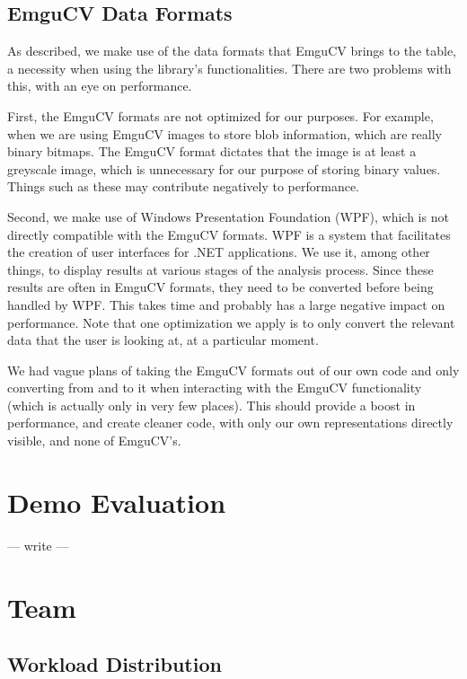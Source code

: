 \documentclass[10pt, abstracton, twocolumn]{scrartcl}
\begin{document}
\begin{appendices}
\subsection{EmguCV Data Formats}
\label{sec:emgucvFormats}
As described, we make use of the data formats that EmguCV brings to the table, a necessity when using the library's functionalities. There are two problems with this, with an eye on performance.

First, the EmguCV formats are not optimized for our purposes. For example, when we are using EmguCV images to store blob information, which are really binary bitmaps. The EmguCV format dictates that the image is at least a greyscale image, which is unnecessary for our purpose of storing binary values. Things such as these may contribute negatively to performance.

Second, we make use of Windows Presentation Foundation (WPF), which is not directly compatible with the EmguCV formats. WPF is a system that facilitates the creation of user interfaces for .NET applications. We use it, among other things, to display results at various stages of the analysis process. Since these results are often in EmguCV formats, they need to be converted before being handled by WPF. This takes time and probably has a large negative impact on performance. Note that one optimization we apply is to only convert the relevant data that the user is looking at, at a particular moment.

We had vague plans of taking the EmguCV formats out of our own code and only converting from and to it when interacting with the EmguCV functionality (which is actually only in very few places). This should provide a boost in performance, and create cleaner code, with only our own representations directly visible, and none of EmguCV's.

\section{Demo Evaluation}
---
write
---

\section{Team}
\label{sec:team}

\subsection{Workload Distribution}


\end{appendices}
\end{document}
